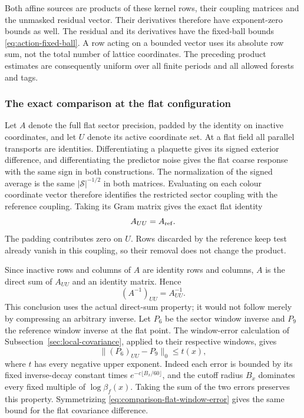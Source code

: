 Both affine sources are products of these kernel rows, their
coupling matrices and the unmasked residual vector. Their
derivatives therefore have exponent-zero bounds as well. The
residual and its derivatives have the fixed-ball bounds
\eqref{eq:action-fixed-ball}. A row acting on a bounded vector
uses its absolute row sum, not the total number of lattice
coordinates. The preceding product estimates are consequently
uniform over all finite periods and all allowed forests and tags.

\subsubsection{The exact comparison at the flat configuration}
Let $A$ denote the full flat sector precision, padded by the
identity on inactive coordinates, and let $U$ denote its active
coordinate set. At a flat field all parallel transports are
identities. Differentiating a plaquette gives its signed exterior
difference, and differentiating the predictor noise gives the
flat coarse response with the same sign in both constructions.
The normalization of the signed average is the same
$|\mathcal S|^{-1/2}$ in both matrices. Evaluating on each colour
coordinate vector therefore identifies the restricted sector
coupling with the reference coupling. Taking its Gram matrix gives
the exact flat identity
\begin{equation}\label{eq:comparison-flat-precision}
                             A_{UU}=A_{\rm ref}.
\end{equation}
The padding contributes zero on $U$. Rows discarded by the
reference keep test already vanish in this coupling, so their
removal does not change the product.

Since inactive rows and columns of $A$ are identity rows and
columns, $A$ is the direct sum of $A_{UU}$ and an identity matrix.
Hence
\[
                         (A^{-1})_{UU}=A_{UU}^{-1}.
\]
This conclusion uses the actual direct-sum property; it would
not follow merely by compressing an arbitrary inverse.
Let $P_6$ be the sector window inverse and $P_9$ the reference
window inverse at the flat point. The window-error calculation
of Subsection~\ref{sec:local-covariance}, applied to their respective
windows, gives
\begin{equation}\label{eq:comparison-flat-window-error}
              \|(P_6)_{UU}-P_9\|_0\le t(x),
\end{equation}
where $t$ has every negative upper exponent. Indeed each error
is bounded by its fixed inverse-decay constant times
$e^{-c\lfloor B_x/60\rfloor}$, and the cutoff radius $B_x$ dominates every fixed
multiple of $\log\beta_f(x)$. Taking the sum of the two errors
preserves this property. Symmetrizing
\eqref{eq:comparison-flat-window-error} gives the same bound
for the flat covariance difference.

